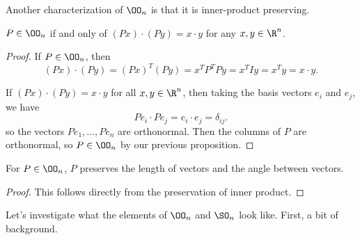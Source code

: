 \documentclass[a4paper]{scrartcl}
\begin{document}
Another characterization of $\OO_n$ is that it is inner-product preserving.

\begin{proposition}
	$P \in \OO_n$ if and only of $(Px) \cdot (Py) = x \cdot y$ for any $x, y \in \R^n$.
\end{proposition}
\begin{proof}
	If $P \in \OO_n$, then 
	$$
	(Px) \cdot (Py) = (Px)^T (Py) = x^T P^T P y = x^T I y = x^Ty = x \cdot y.
	$$

	If $(Px) \cdot (Py) = x \cdot y$ for all $x, y \in \R^n$, then taking the basis vectors $e_i$ and $e_j$, we have
	$$
	Pe_i \cdot Pe_j = e_i \cdot e_j = \delta_{ij}.
	$$
	so the vectors $Pe_1,\dots, Pe_n$ are orthonormal. Then the columns of $P$ are orthonormal, so $P \in \OO_n$ by our previous proposition. 
\end{proof}

\begin{corollary}
	For $P \in \OO_n$, $P$ preserves the length of vectors and the angle between vectors.
\end{corollary}
\begin{proof}
	This follows directly from the preservation of inner product.
\end{proof}

Let's investigate what the elements of $\OO_n$ and $\SO_n$ look like. First, a bit of background.
\end{document}
